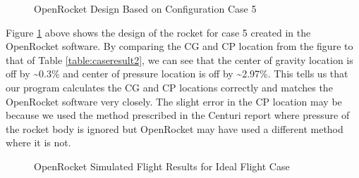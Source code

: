 \documentclass{report}
\begin{document}
\begin{figure}[h!]
    \centering
    \caption{OpenRocket Design Based on Configuration Case 5}
    \label{fig:rocketDesign}
\end{figure}

\noindent Figure \ref{fig:rocketDesign} above shows the design of the rocket for case 5 created in the OpenRocket software.
By comparing the CG and CP location from the figure to that of Table \ref{table:caseresult2}, we can see that the center of gravity location is off by \textasciitilde0.3\% and center of pressure location is off by \textasciitilde2.97\%.
This tells us that our program calculates the CG and CP locations correctly and matches the OpenRocket software very closely.
The slight error in the CP location may be because we used the method prescribed in the Centuri report where pressure of the rocket body is ignored but OpenRocket may have used a different method where it is not.\\

\begin{figure}[h!]
    \centering
    \caption{OpenRocket Simulated Flight Results for Ideal Flight Case}
    \label{fig:idealCurve}
\end{figure}
\end{document}
